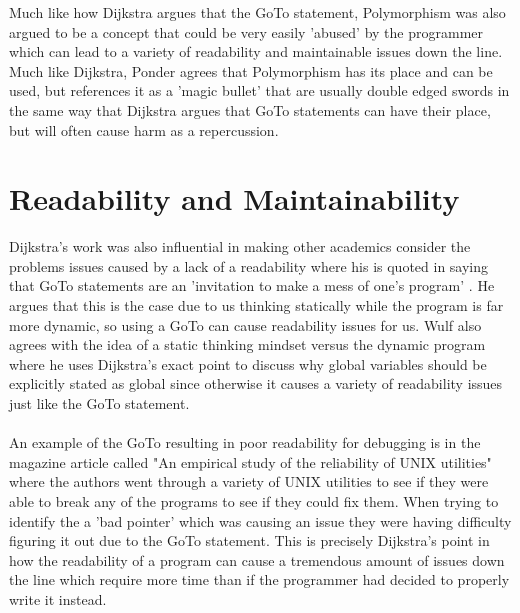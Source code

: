\documentclass{article}
\begin{document}
Much like how Dijkstra argues that the GoTo statement, Polymorphism was also argued to be a concept that could be very easily 'abused' \cite{Ponder:1992:PCH:130981.130991} by the programmer which can lead to a variety of readability and maintainable issues down the line. Much like Dijkstra, Ponder agrees that Polymorphism has its place and can be used, but references it as a 'magic bullet'\cite{Ponder:1992:PCH:130981.130991} that are usually double edged swords in the same way that Dijkstra argues that GoTo statements can have their place, but will often cause harm as a repercussion.
\\
\section{Readability and Maintainability}
Dijkstra's work was also influential in making other academics consider the problems issues caused by a lack of a readability where his is quoted in saying that GoTo statements are an 'invitation to make a mess of one's program' \cite{dijkstra1968_goto}. He argues that this is the case due to us thinking statically while the program is far more dynamic, so using a GoTo can cause readability issues for us. Wulf \cite{Wulf:1973:GVC:953353.953355} also agrees with the idea of a static thinking mindset versus the dynamic program where he uses Dijkstra's exact point to discuss why global variables should be explicitly stated as global since otherwise it causes a variety of readability issues just like the GoTo statement.
\\
\\
An example of the GoTo resulting in poor readability for debugging is in the magazine article called "An empirical study of the reliability of UNIX utilities" \cite{Miller:1990:ESR:96267.96279} where the authors went through a variety of UNIX utilities to see if they were able to break any of the programs to see if they could fix them. When trying to identify the a 'bad pointer' \cite{Miller:1990:ESR:96267.96279} which was causing an issue they were having difficulty figuring it out due to the GoTo statement. This is precisely Dijkstra's point in how the readability of a program can cause a tremendous amount of issues down the line which require more time than if the programmer had decided to properly write it instead.
\\
\end{document}
